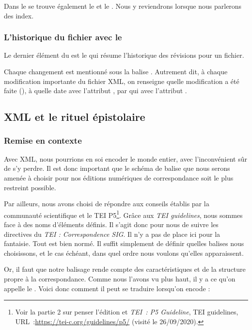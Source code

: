 Dans le  se trouve également le  et le . Nous y reviendrons lorsque nous parlerons des index.

\subsubsection{L'historique du fichier avec le }
Le dernier élément du  est le  qui résume l'historique des révisions pour un fichier.

Chaque changement est mentionné sous la balise . Autrement dit, à chaque modification importante du fichier XML, on renseigne quelle modification a été faite (), à quelle date avec l'attribut , par qui avec l'attribut .


\subsection{XML et le rituel épistolaire}

\subsubsection{Remise en contexte}
Avec XML, nous pourrions en soi encoder le monde entier, avec l'inconvénient sûr de s'y perdre. Il est donc important que le schéma de balise que nous serons amenée à choisir pour nos éditions numériques de correspondance soit le plus restreint possible. 

Par ailleurs, nous avons choisi de répondre aux conseils établis par la communauté scientifique et le TEI P5\footnote{Voir la partie 2 sur penser l'édition et \emph{TEI~: P5 Guideline}, TEI guidelines,  URL~:\url{https://tei-c.org/guidelines/p5/} (visité le 26/09/2020).}. Grâce aux \emph{TEI guidelines}, nous sommes face à des noms d'éléments définis. Il s'agit donc pour nous de suivre les directives du \emph{TEI : Correspondence SIG}. Il n'y a pas de place ici pour la fantaisie. Tout est bien normé. Il suffit simplement de définir quelles balises nous choisissons, et le cas échéant, dans quel ordre nous voulons qu'elles apparaissent.

Or, il faut que notre balisage rende compte des caractéristiques et de la structure propre à la correspondance. Comme nous l'avons vu plus haut, il y a ce qu'on appelle le . Voici donc comment il peut se traduire  lorsqu'on encode : 

